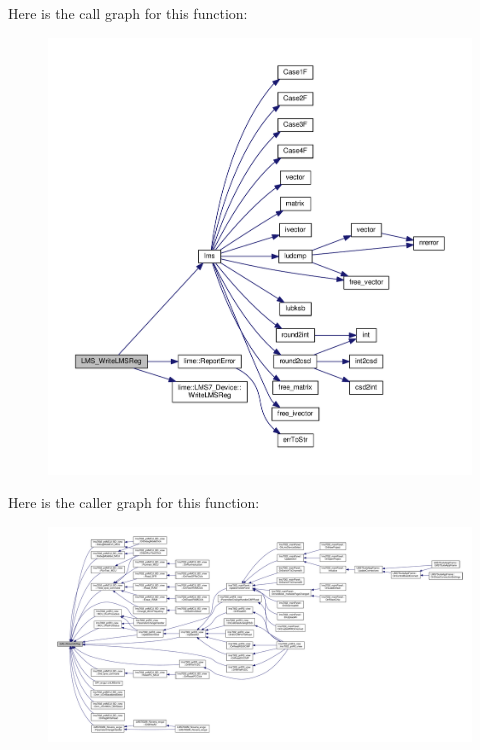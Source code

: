 Here is the call graph for this function\+:
\nopagebreak
\begin{figure}[H]
\begin{center}
\leavevmode
\includegraphics[width=350pt]{df/de1/lms7__api_8cpp_afd3d3c3227c91840a1c127805c3a3032_cgraph}
\end{center}
\end{figure}




Here is the caller graph for this function\+:
\nopagebreak
\begin{figure}[H]
\begin{center}
\leavevmode
\includegraphics[width=350pt]{df/de1/lms7__api_8cpp_afd3d3c3227c91840a1c127805c3a3032_icgraph}
\end{center}
\end{figure}


